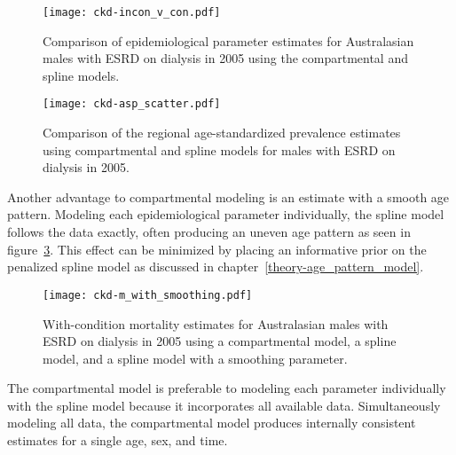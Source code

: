     \begin{figure}[h]
        \begin{center}
            \texttt{[image: ckd-incon\_v\_con.pdf]}
            \caption{Comparison of epidemiological parameter estimates
              for Australasian males with ESRD on dialysis
              in 2005 using the compartmental and spline
              models.}
            \label{fig:app-CKD incon v con}
        \end{center}
    \end{figure}

    \begin{figure}[h]
        \begin{center}
            \texttt{[image: ckd-asp\_scatter.pdf]}
            \caption{Comparison of the regional age-standardized
              prevalence estimates using compartmental and spline
              models for males with ESRD on dialysis in
              2005.}
            \label{fig:app-CKD asp}
        \end{center}
    \end{figure}

Another advantage to compartmental modeling is an estimate with a smooth
age pattern. Modeling each epidemiological parameter individually, the
spline model follows the data exactly, often producing an
uneven age pattern as seen in figure~\ref{fig:app-CKD smooth}.  This
effect can be minimized by placing an informative prior on the
penalized spline model as discussed in chapter~\ref{theory-age_pattern_model}.

    \begin{figure}[h]
        \begin{center}
            \texttt{[image: ckd-m\_with\_smoothing.pdf]}
            \caption{With-condition mortality estimates for
              Australasian males with ESRD on dialysis in
              2005 using a compartmental model, a spline model,
              and a spline model with a smoothing parameter.}
            \label{fig:app-CKD smooth}
        \end{center}
    \end{figure}

The compartmental model is preferable to modeling each parameter
individually with the spline model because it incorporates all
available data.  Simultaneously modeling all data, the compartmental
model produces internally consistent estimates for a single age,
sex, and time.
